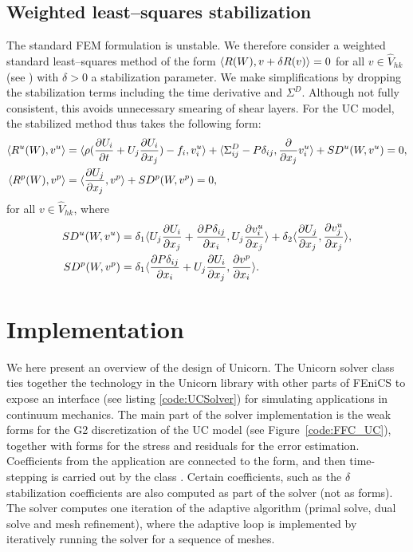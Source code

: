 \subsection{Weighted least--squares stabilization}

The standard FEM formulation is unstable.  We therefore consider a
weighted standard least--squares method of the form
$\langle R(W), v + \delta R(v) \rangle = 0$ for all $v \in \hat{V}_{hk}$ (see
\citet{ErikssonEstepHansboEtAl1996,HoffmanJohnson2007}) with $\delta > 0$ a stabilization
parameter. We make simplifications by dropping the stabilization terms
including the time derivative and $\Sigma^D$. Although not fully
consistent, this avoids unnecessary smearing of shear layers. For the
UC model, the stabilized method thus takes the following form:
\begin{align}
  \langle R^u(W), v^u \rangle &=
  \langle \rho(\frac{\partial U_i}{\partial t} + U_j \frac{\partial U_i}{\partial x_j} ) - f_i, v^u_i \rangle +
  \langle \Sigma^D_{ij} - P \delta_{ij}, \frac{\partial}{\partial x_j} v^u_i \rangle + SD^u(W, v^u) = 0, \\
  \langle R^p(W), v^p \rangle &= \langle \frac{\partial U_j}{\partial x_j}, v^p \rangle + SD^p(W, v^p) = 0,
\end{align}
for all $v \in \hat{V}_{hk}$, where
\begin{align}
  SD^u(W, v^u) &=
  \delta_1 \langle U_j \frac{\partial U_i}{\partial x_j} + \frac{\partial P \delta_{ij}}{\partial x_i}, U_j \frac{\partial v^u_i}{\partial x_j}  \rangle +
  \delta_2 \langle \frac{\partial U_j}{\partial x_j}, \frac{\partial v^u_j}{\partial x_j}  \rangle, \\
  SD^p(W, v^p) &= \delta_1 \langle \frac{\partial P \delta_{ij}}{\partial x_i} + U_j \frac{\partial U_i}{\partial x_j}, \frac{\partial v^p}{\partial x_i} \rangle.
\end{align}

\section{Implementation}

We here present an overview of the design of Unicorn. The Unicorn
solver class  ties together the technology in the
Unicorn library with other parts of FEniCS to expose an interface (see
listing \ref{code:UCSolver}) for simulating applications in continuum
mechanics. The main part of the solver implementation is the weak
forms for the G2 discretization of the UC model (see
Figure~\ref{code:FFC_UC}), together with forms for the stress and
residuals for the error estimation. Coefficients from the application
are connected to the form, and then time-stepping is carried out by
the class . Certain coefficients, such as the
$\delta$ stabilization coefficients are also computed as part of the
solver (not as forms). The solver computes one iteration of the
adaptive algorithm (primal solve, dual solve and mesh refinement),
where the adaptive loop is implemented by iteratively running the
solver for a sequence of meshes.

